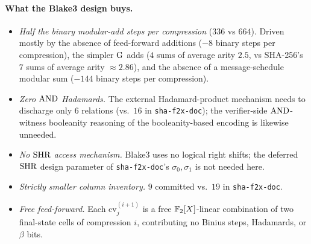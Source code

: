 \paragraph{What the Blake3 design buys.}
\begin{itemize}[leftmargin=2em,topsep=2pt]
  \item \emph{Half the binary modular-add steps per compression}
        ($336$ vs $664$). Driven mostly by the absence of feed-forward
        additions ($-8$ binary steps per compression), the simpler
        $\operatorname{G}$ adds ($4$ sums of average arity $2.5$, vs SHA-256's
        $7$ sums of average arity $\approx 2.86$), and the absence of
        a message-schedule modular sum ($-144$ binary steps per
        compression).
  \item \emph{Zero $\operatorname{AND}$ Hadamards.} The external Hadamard-product
        mechanism needs to discharge only $6$ relations (vs.\ $16$ in
        \texttt{sha-f2x-doc}); the verifier-side $\operatorname{AND}$-witness
        booleanity reasoning of the booleanity-based encoding is
        likewise unneeded.
  \item \emph{No $\operatorname{SHR}$ access mechanism.} Blake3 uses no logical
        right shifts; the deferred $\operatorname{SHR}$ design parameter of
        \texttt{sha-f2x-doc}'s $\sigma_0, \sigma_1$ is not needed
        here.
  \item \emph{Strictly smaller column inventory.} $9$ committed
        vs.\ $19$ in \texttt{sha-f2x-doc}.
  \item \emph{Free feed-forward.} Each $\mathrm{cv}^{(i+1)}_j$ is a
        free $\mathbb{F}_2[X]$-linear combination of two final-state cells of
        compression $i$, contributing no Binius steps, Hadamards, or
        $\beta$ bits.
\end{itemize}

